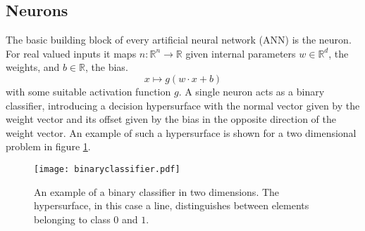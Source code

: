 %



\subsection{Neurons}
\label{sec:Neurons}
The basic building block of every artificial neural network (ANN) is the neuron. For real valued inputs it maps $n: \mathbb{R}^n \rightarrow \mathbb{R}$ given internal parameters $w \in \mathbb{R}^d$, the weights, and $b \in \mathbb{R}$, the bias.
\begin{equation}
x \mapsto g(w \cdot x + b)
\end{equation}
with some suitable activation function $g$. A single neuron acts as a binary classifier, introducing a decision hypersurface with the normal vector given by the weight vector and its offset given by the bias in the opposite direction of the weight vector. An example of such a hypersurface is shown for a two dimensional problem in figure \ref{fig:binaryclassifier}. \\

\begin{figure}[H]
\centering
  \texttt{[image: binaryclassifier.pdf]}
  \caption{An example of a binary classifier in two dimensions. The hypersurface, in this case a line, distinguishes between elements belonging to class $0$ and $1$.}
  \label{fig:binaryclassifier}
\end{figure}

